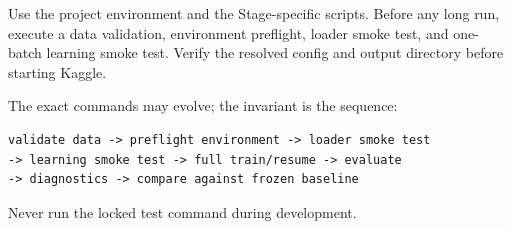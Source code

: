 Use the project environment and the Stage-specific scripts. Before any long run, execute a data validation, environment preflight, loader smoke test, and one-batch learning smoke test. Verify the resolved config and output directory before starting Kaggle.

The exact commands may evolve; the invariant is the sequence:

\begin{lstlisting}[language={}]
validate data -> preflight environment -> loader smoke test
-> learning smoke test -> full train/resume -> evaluate
-> diagnostics -> compare against frozen baseline
\end{lstlisting}

Never run the locked test command during development.


